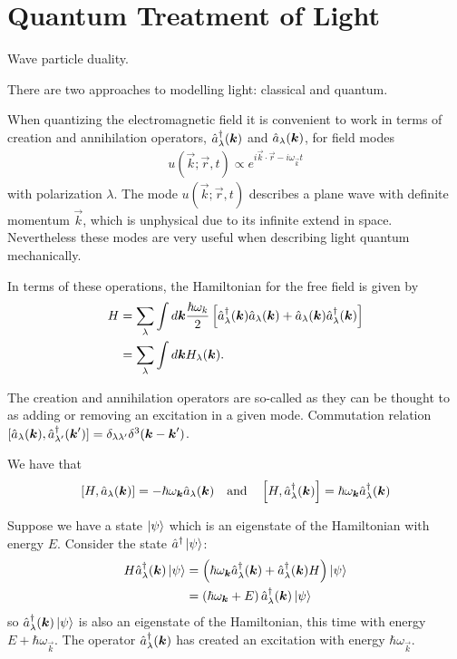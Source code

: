 \section{Quantum Treatment of Light}

Wave particle duality.

There are two approaches to modelling light: classical and quantum. 

When quantizing the electromagnetic field it is convenient to work in terms of creation and annihilation operators, $\hat{a}^\dagger_\lambda({\boldsymbol{k}})$ and $\hat{a}_\lambda({\boldsymbol{k}})$, for field modes
\begin{align}
  u(\vec{k}; \vec{r}, t) \propto e^{i\vec{k} \cdot \vec{r} - i\omega_\vec{k} t}
\end{align}
with polarization $\lambda$. The mode $u(\vec{k}; \vec{r}, t)$ describes a plane wave with definite momentum $\vec{k}$, which is unphysical due to its infinite extend in space. Nevertheless these modes are very useful when describing light quantum mechanically.

In terms of these operations, the Hamiltonian for the free field is given by
\begin{align}
  H &= \sum_\lambda \int d{\boldsymbol{k}} \frac{\hbar\omega_k}{2} \left[ \hat{a}^\dagger_\lambda({\boldsymbol{k}})\hat{a}_\lambda({\boldsymbol{k}}) + \hat{a}_\lambda({\boldsymbol{k}})\hat{a}^\dagger_\lambda({\boldsymbol{k}}) \right] \\
  &= \sum_\lambda \int d{\boldsymbol{k}} H_\lambda({\boldsymbol{k}}).
\end{align}

The creation and annihilation operators are so-called as they can be thought to as adding or removing an excitation in a given mode. Commutation relation $[\hat{a}_\lambda({\boldsymbol{k}}), \hat{a}^\dagger_{\lambda '}({\boldsymbol{k}}')]  = \delta_{\lambda\lambda '}\delta^3({\boldsymbol{k}} - {\boldsymbol{k}}') $.

We have that
\begin{align}
  \left[H, \hat{a}_\lambda({\boldsymbol{k}})\right] = -\hbar \omega_{{\boldsymbol{k}}} \hat{a}_\lambda({\boldsymbol{k}})
  \quad \text{and} \quad 
  \left[H, \hat{a}^\dagger_\lambda({\boldsymbol{k}})\right] = \hbar \omega_{{\boldsymbol{k}}} \hat{a}^\dagger_\lambda({\boldsymbol{k}})
\end{align}

Suppose we have a state $\left\vert\psi\right\rangle$ which is an eigenstate of the Hamiltonian with energy $E$. Consider the state $\hat{a}^\dagger\left\vert\psi\right\rangle$:
\begin{align}
  H\hat{a}^\dagger_\lambda({\boldsymbol{k}})\left\vert\psi\right\rangle &= \left(\hbar \omega_{{\boldsymbol{k}}} \hat{a}^\dagger_\lambda({\boldsymbol{k}}) + \hat{a}^\dagger_\lambda({\boldsymbol{k}})H\right) \left\vert\psi\right\rangle \\
  &= \left(\hbar \omega_{{\boldsymbol{k}}} + E\right) \hat{a}^\dagger_\lambda({\boldsymbol{k}})\left\vert\psi\right\rangle
\end{align}
so $\hat{a}^\dagger_\lambda({\boldsymbol{k}})\left\vert\psi\right\rangle$ is also an eigenstate of the Hamiltonian, this time with energy $E + \hbar\omega_\vec{k}$. The operator $\hat{a}^\dagger_\lambda({\boldsymbol{k}})$ has created an excitation with energy $\hbar \omega_\vec{k}$.

